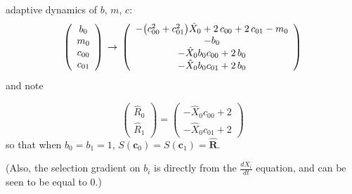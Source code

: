 \documentclass{article}
\begin{document}
adaptive dynamics of $b$, $m$, $c$:
\[\left(\begin{array}{c}
  b_{0}\\
  m_{0}\\
  c_{00}\\
  c_{01}
\end{array}\right)\\
\to\\
\left(\begin{array}{c}
  -{\left(c_{00}^{2} + c_{01}^{2}\right)} \hat{X}_{0} + 2 \, c_{00} + 2 \, c_{01} - m_{0}\\
  -b_{0}\\
  -\hat{X}_{0} b_{0} c_{00} + 2 \, b_{0}\\
  -\hat{X}_{0} b_{0} c_{01} + 2 \, b_{0}
\end{array}\right)\]
and note

\[
  \left(\begin{array}{c}
  \hat{R}_{0}\\
  \hat{R}_{1}
\end{array}\right) = \left(\begin{array}{c}
  -\hat{X}_{0} c_{00} + 2\\
  -\hat{X}_{0} c_{01} + 2
\end{array}\right)
\]
so that when $b_0=b_1=1$, $S(\mathbf{c}_0)=S(\mathbf{c}_1)=\hat{\mathbf{R}}$.

(Also, the selection gradient on $b_i$ is directly from the $\frac{dX_i}{dt}$ equation, and can be seen to be equal to 0.)
\end{document}
